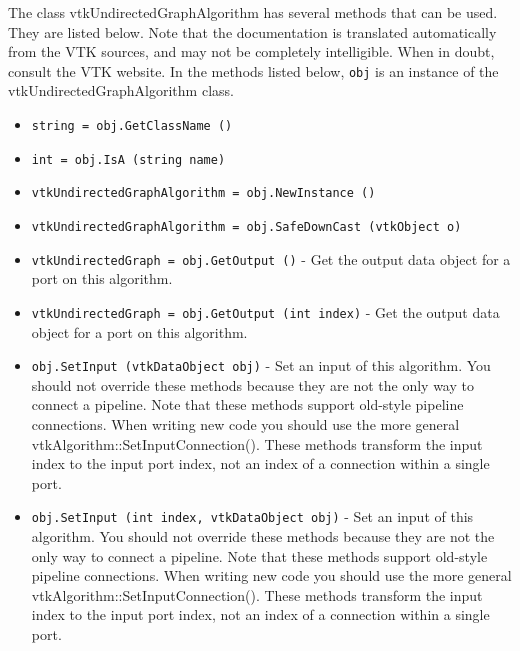 The class vtkUndirectedGraphAlgorithm has several methods that can be used.
  They are listed below.
Note that the documentation is translated automatically from the VTK sources,
and may not be completely intelligible.  When in doubt, consult the VTK website.
In the methods listed below, \verb|obj| is an instance of the vtkUndirectedGraphAlgorithm class.
\begin{itemize}
\item  \verb|string = obj.GetClassName ()|

\item  \verb|int = obj.IsA (string name)|

\item  \verb|vtkUndirectedGraphAlgorithm = obj.NewInstance ()|

\item  \verb|vtkUndirectedGraphAlgorithm = obj.SafeDownCast (vtkObject o)|

\item  \verb|vtkUndirectedGraph = obj.GetOutput ()| -  Get the output data object for a port on this algorithm.

\item  \verb|vtkUndirectedGraph = obj.GetOutput (int index)| -  Get the output data object for a port on this algorithm.

\item  \verb|obj.SetInput (vtkDataObject obj)| -  Set an input of this algorithm. You should not override these
 methods because they are not the only way to connect a pipeline.
 Note that these methods support old-style pipeline connections.
 When writing new code you should use the more general
 vtkAlgorithm::SetInputConnection().  These methods transform the
 input index to the input port index, not an index of a connection
 within a single port.

\item  \verb|obj.SetInput (int index, vtkDataObject obj)| -  Set an input of this algorithm. You should not override these
 methods because they are not the only way to connect a pipeline.
 Note that these methods support old-style pipeline connections.
 When writing new code you should use the more general
 vtkAlgorithm::SetInputConnection().  These methods transform the
 input index to the input port index, not an index of a connection
 within a single port.

\end{itemize}
